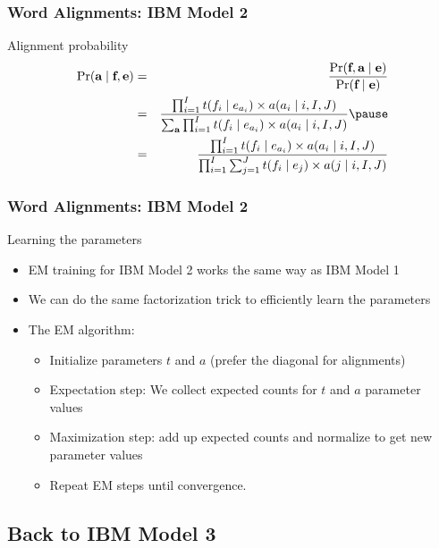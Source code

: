 \begin{frame}
\frametitle{Word Alignments: IBM Model 2}
\begin{block}{Alignment probability}
\begin{eqnarray*}
\Pr(\aln \mid \src, \tgt) & = & \frac{ \Pr( \src, \aln \mid \tgt ) }{ \Pr(\src \mid \tgt) } \\
& = & \frac{ \prod_{i=1}^I t(f_i \mid e_{a_i}) \times a(a_i \mid i, I, J) }{ \sum_{\aln} \prod_{i=1}^I t(f_i \mid e_{a_i}) \times a(a_i \mid i, I, J) } \pause\\
& = & \frac{ \prod_{i=1}^I t(f_i \mid e_{a_i}) \times a(a_i \mid i, I, J) }{ \prod_{i=1}^I \sum_{j=1}^J t(f_i \mid e_j) \times a(j \mid i, I, J) }
\end{eqnarray*}
\end{block}

\end{frame}

\begin{frame}
\frametitle{Word Alignments: IBM Model 2}

\begin{block}{Learning the parameters}
\begin{itemize}[<+->]
\item EM training for IBM Model 2 works the same way as IBM Model 1
\item We can do the same factorization trick to efficiently learn the parameters
\item The EM algorithm:
\begin{itemize}
\item Initialize parameters $t$ and $a$ (prefer the diagonal for alignments)
\item Expectation step: We collect expected counts for $t$ and $a$ parameter values
\item Maximization step: add up expected counts and normalize to get new parameter values
\item Repeat EM steps until convergence.
\end{itemize}
\end{itemize}

\end{block}


\end{frame}

\subsection{Back to IBM Model 3}
\frame{\tableofcontents[currentsection]}

